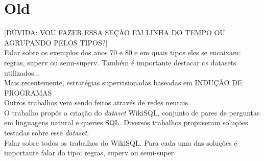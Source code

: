 \documentclass{article}
\begin{document}







\section{Old}

[DÚVIDA: VOU FAZER ESSA SEÇÃO EM LINHA DO TEMPO OU AGRUPANDO PELOS TIPOS?]\\

Falar sobre os exemplos dos anos 70 e 80 e em quais tipos eles se encaixam: regras, superv ou semi-superv. Também é importante destacar os datasets utilizados...\\

Mais recentemente, estratégias supervisionadas baseadas em INDUÇÃO DE PROGRAMAS\\

Outros trabalhos vem sendo feitos através de redes neurais.\\

O trabalho \citep{zhong2017seq2sql} propôs a criação do \textit{dataset} WikiSQL, conjunto de pares de perguntas em linguagens natural e queries SQL. Diversos trabalhos propuseram soluções testadas sobre esse \textit{dataset}.\\

Falar sobre todos os trabalhos do WikiSQL. Para cada uma das soluções é importante falar do tipo: regras, superv ou semi-super\\

\end{document}
